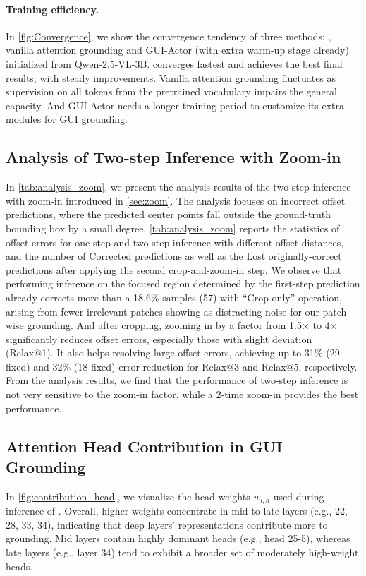 \paragraph{Training efficiency.} In \cref{fig:Convergence}, we show the convergence tendency of three methods: \method{}, vanilla attention grounding and GUI-Actor (with extra warm-up stage already) initialized from Qwen-2.5-VL-3B. \method{} converges fastest and achieves the best final results, with steady improvements. Vanilla attention grounding fluctuates as supervision on all tokens from the pretrained vocabulary impairs the general capacity. And GUI-Actor needs a longer training period to customize its extra modules for GUI grounding. 
\subsection{Analysis of Two-step Inference with Zoom-in}\label{sec:zoomin_analysis}
In \cref{tab:analysis_zoom}, we present the analysis results of the two-step inference with zoom-in introduced in \cref{sec:zoom}. The analysis focuses on incorrect offset predictions, where the predicted center points fall outside the ground-truth bounding box by a small degree. \cref{tab:analysis_zoom} reports the statistics of offset errors for one-step and two-step inference with different offset distances, and the number of {Corrected} predictions as well as the {Lost} originally-correct predictions after applying the second crop-and-zoom-in step. 
We observe that performing inference on the focused region determined by the first-step prediction already corrects more than a 18.6\% samples (57) with ``Crop-only'' operation, arising from fewer irrelevant patches showing as distracting noise for our patch-wise grounding. And after cropping, zooming in by a factor from 1.5× to 4× significantly reduces offset errors, especially those with slight deviation (Relax@1). It also helps resolving large-offset errors, achieving up to 31\% (29 fixed) and 32\% (18 fixed) error reduction for Relax@3 and Relax@5, respectively. From the analysis results, we find that the performance of two-step inference is not very sensitive to the zoom-in factor, while a 2-time zoom-in provides the best performance.
\subsection{Attention Head Contribution in GUI Grounding}
In \cref{fig:contribution_head}, we visualize the head weights $w_{l,h}$ used during inference of \method{}. Overall, higher weights concentrate in mid-to-late layers (e.g., 22, 28, 33, 34), indicating that deep layers' representations contribute more to grounding. Mid layers contain highly dominant heads (e.g., head 25-5), whereas late layers (e.g., layer 34) tend to exhibit a broader set of moderately high-weight heads.

